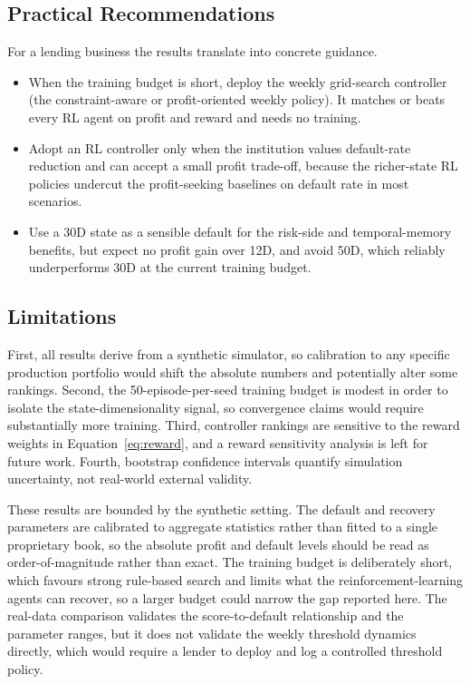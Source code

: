 \documentclass[preprint,review,authoryear,12pt]{elsarticle}
\begin{document}
\subsection{Practical Recommendations}

For a lending business the results translate into concrete guidance.
\begin{itemize}
    \item When the training budget is short, deploy the weekly grid-search controller (the
          constraint-aware or profit-oriented weekly policy). It matches or beats every RL
          agent on profit and reward and needs no training.
    \item Adopt an RL controller only when the institution values default-rate reduction
          and can accept a small profit trade-off, because the richer-state RL policies
          undercut the profit-seeking baselines on default rate in most scenarios.
    \item Use a 30D state as a sensible default for the risk-side and temporal-memory
          benefits, but expect no profit gain over 12D, and avoid 50D, which reliably
          underperforms 30D at the current training budget.
\end{itemize}

\subsection{Limitations}

First, all results derive from a synthetic simulator, so calibration to any specific
production portfolio would shift the absolute numbers and potentially alter some
rankings. Second, the 50-episode-per-seed training budget is modest in order to isolate
the state-dimensionality signal, so convergence claims would require substantially more
training. Third, controller rankings are sensitive to the reward weights in
Equation~\eqref{eq:reward}, and a reward sensitivity analysis is left for future work.
Fourth, bootstrap confidence intervals quantify simulation uncertainty, not real-world
external validity.

These results are bounded by the synthetic setting. The default and recovery parameters are calibrated to aggregate statistics rather than fitted to a single proprietary book, so the absolute profit and default levels should be read as order-of-magnitude rather than exact. The training budget is deliberately short, which favours strong rule-based search and limits what the reinforcement-learning agents can recover, so a larger budget could narrow the gap reported here. The real-data comparison validates the score-to-default relationship and the parameter ranges, but it does not validate the weekly threshold dynamics directly, which would require a lender to deploy and log a controlled threshold policy.
\end{document}
